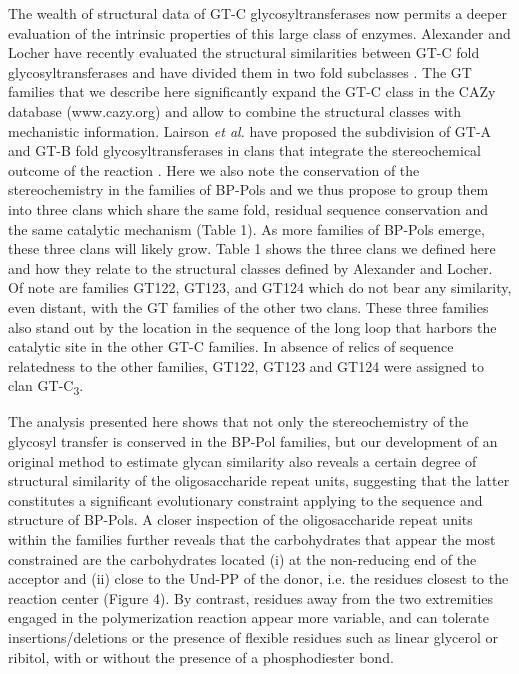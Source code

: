 \documentclass{article}
\begin{document}
The wealth of structural data of GT-C glycosyltransferases now permits a deeper evaluation of the intrinsic properties of this large class of enzymes. Alexander and Locher have recently evaluated the structural similarities between GT-C fold glycosyltransferases and have divided them in two fold subclasses \cite{alexander_emerging_2023}. The GT families that we describe here significantly expand the GT-C class in the CAZy database (www.cazy.org) and allow to combine the structural classes with mechanistic information.  Lairson \textit{et al.} have proposed the subdivision of GT-A and GT-B fold glycosyltransferases in clans that integrate the stereochemical outcome of the reaction \cite{lairson_glycosyltransferases_2008}. Here we also note the conservation of the stereochemistry in the families of BP-Pols and we thus propose to group them into three clans which share the same fold, residual sequence conservation and the same catalytic mechanism (Table 1). As more families of BP-Pols emerge, these three clans will likely grow. Table 1 shows the three clans we defined here and how they relate to the structural classes defined by Alexander and Locher. Of note are families GT122, GT123, and GT124 which do not bear any similarity, even distant, with the GT families of the other two clans. These three families also stand out by the location in the sequence of the long loop that harbors the catalytic site in the other GT-C families. In absence of relics of sequence relatedness to the other families, GT122, GT123 and GT124  were assigned  to clan GT-C\textsubscript{3}.

The analysis presented here shows that not only the stereochemistry of the glycosyl transfer is conserved in the BP-Pol families, but our development of an original method to estimate glycan similarity also reveals a certain degree of structural similarity of the oligosaccharide repeat units, suggesting that the latter constitutes a significant evolutionary constraint applying to the sequence and structure of BP-Pols. A closer inspection of the oligosaccharide repeat units within the families further reveals that the carbohydrates that appear the most constrained are the carbohydrates located (i) at the non-reducing end of the acceptor and (ii) close to the Und-PP of the donor, i.e. the residues closest to the reaction center (Figure 4). By contrast, residues away from the two extremities engaged in the polymerization reaction appear more variable, and can tolerate insertions/deletions or the presence of flexible residues such as linear glycerol or ribitol, with or without the presence of a phosphodiester bond.
\end{document}

